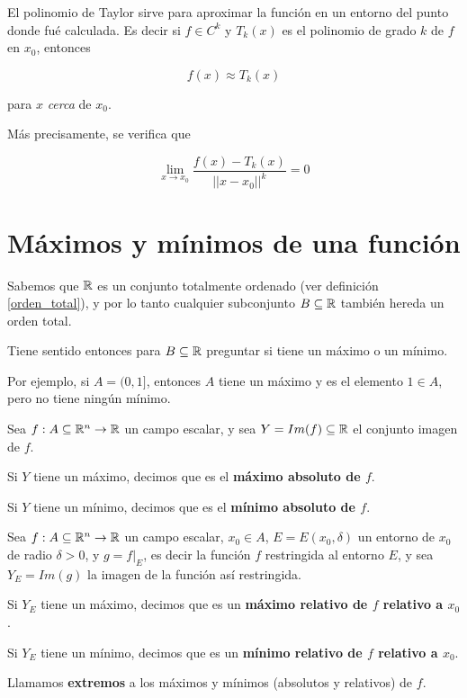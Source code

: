 El polinomio de Taylor sirve para aproximar la función en un entorno del punto donde fué calculada.  Es decir si $f \in C^k$ y $T_k(x)$ es el polinomio de grado $k$ de $f$ en $x_0$, entonces

$$ f(x) \approx T_k(x)$$

para $x$ \emph{cerca} de $x_0$.

Más precisamente, se verifica que

$$ \lim_{x \to x_0} \frac{ f(x) - T_k(x) }{ ||x-x_0||^k } = 0$$

\section{Máximos y mínimos de una función}

Sabemos que $\mathbb{R}$ es un conjunto totalmente ordenado (ver definición \ref{orden_total}), y por lo tanto cualquier subconjunto $B \subseteq \mathbb{R}$ también hereda un orden total.

Tiene sentido entonces para $B \subseteq \mathbb{R}$ preguntar si tiene un máximo o un mínimo.

Por ejemplo, si $A = (0,1]$, entonces $A$ tiene un máximo y es el elemento $1 \in A$, pero no tiene ningún mínimo.

\begin{definition} 
Sea $f : A \subseteq \mathbb{R}^n \to \mathbb{R}$ un campo escalar, y sea $Y = Im(f) \subseteq \mathbb{R}$ el conjunto imagen de $f$.  

Si $Y$ tiene un máximo, decimos que es el \textbf{máximo absoluto de $f$}.  

Si $Y$ tiene un mínimo, decimos que es el \textbf{mínimo absoluto de $f$}.  
\end{definition}

\begin{definition} 
Sea $f : A \subseteq \mathbb{R}^n \to \mathbb{R}$ un campo escalar, $x_0 \in A$, $E = E(x_0, \delta)$ un entorno de $x_0$ de radio $\delta > 0$, y $g = f|_{E}$, es decir la función $f$ restringida al entorno $E$, y sea $Y_E = Im(g)$ la imagen de la función así restringida.

Si $Y_E$ tiene un máximo, decimos que es un \textbf{máximo relativo de $f$ relativo a $x_0$}.

Si $Y_E$ tiene un mínimo, decimos que es un \textbf{mínimo relativo de $f$ relativo a $x_0$}.
\end{definition}

\begin{definition}[Extremos]
Llamamos \textbf{extremos} a los máximos y mínimos (absolutos y relativos) de $f$.
\end{definition}

